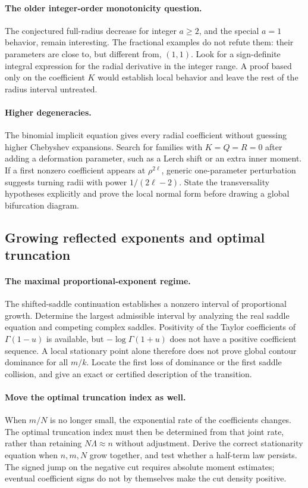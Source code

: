 \paragraph{The older integer-order monotonicity question.}
The conjectured full-radius decrease for integer $a\geq2$,
and the special $a=1$ behavior, remain interesting.
The fractional examples do not refute them: their parameters
are close to, but different from, $(1,1)$.
Look for a sign-definite integral expression for the radial
derivative in the integer range. A proof based only on the
coefficient $K$ would establish local behavior and leave the
rest of the radius interval untreated.

\paragraph{Higher degeneracies.}
The binomial implicit equation gives every radial coefficient
without guessing higher Chebyshev expansions. Search for
families with $K=Q=R=0$ after adding a deformation parameter,
such as a Lerch shift or an extra inner moment. If a first
nonzero coefficient appears at $\rho^{2\ell}$, generic
one-parameter perturbation suggests turning radii with
power $1/(2\ell-2)$. State the transversality hypotheses
explicitly and prove the local normal form before drawing
a global bifurcation diagram.

\subsection{Growing reflected exponents and optimal truncation}

\paragraph{The maximal proportional-exponent regime.}
The shifted-saddle continuation establishes a nonzero
interval of proportional growth. Determine the largest
admissible interval by analyzing the real saddle equation
and competing complex saddles. Positivity of the Taylor
coefficients of $\Gamma(1-u)$ is available, but
$-\log\Gamma(1+u)$ does not have a positive coefficient
sequence. A local stationary point alone therefore does
not prove global contour dominance for all $m/k$.
Locate the first loss of dominance or the first saddle
collision, and give an exact or certified description of
the transition.

\paragraph{Move the optimal truncation index as well.}
When $m/N$ is no longer small, the exponential rate of the
coefficients changes. The optimal truncation index must
then be determined from that joint rate, rather than
retaining $N\Lambda\approx n$ without adjustment.
Derive the correct stationarity equation when $n,m,N$
grow together, and test whether a half-term law persists.
The signed jump on the negative cut requires absolute
moment estimates; eventual coefficient signs do not by
themselves make the cut density positive.

